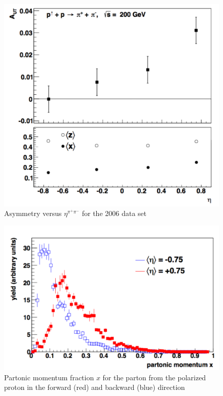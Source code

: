 \documentclass[abstract = on,listof=totoc, bibliography=totoc]{scrreprt}
\newcommand{\etapair}{\eta^{\pi^+\pi^-}}
\newcommand{\pip}{\pi^+}
\newcommand{\pim}{\pi^-}
\newcommand{\pair}{$\pip\pim$ }
\begin{document}
 \begin{figure}
\begin{center}
\includegraphics[width = 1\textwidth]{ansEta_new}
\caption[$A_{UT}$ vs $\etapair$ in 2006 data set]{Asymmetry versus $\etapair$ for the 2006 data set}
\label{fig:ansEta}
\end{center}
\end{figure}


 \begin{figure}
\begin{center}
\includegraphics[width = 1\textwidth]{2006SimX}
\caption[Partonic momentum fraction in 2006 simulation forward and backward \pair pair]{Partonic momentum fraction $x$ for the parton from the polarized proton in the forward (red) and backward (blue) direction}
\label{fig:2006SimX}
\end{center}
\end{figure}
\end{document}
